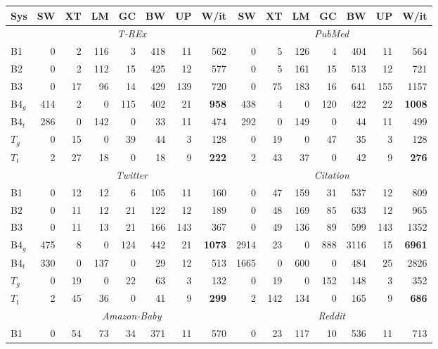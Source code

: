 \begin{tabular*}{\columnwidth}{@{\extracolsep{\fill}}l rrrrrr r rrrrrr r@{}}
\toprule
\textbf{Sys} & SW & XT & LM & GC & BW & UP & W/it & SW & XT & LM & GC & BW & UP & W/it\\
\midrule
& \multicolumn{7}{c}{\textit{T-REx}} & \multicolumn{7}{c}{\textit{PubMed}}\\
\cmidrule(lr){2-8}\cmidrule(l){9-15}
B1 & 0 & 2 & 116 & 3 & 418 & 11 & 562 & 0 & 5 & 126 & 4 & 404 & 11 & 564\\
B2 & 0 & 2 & 112 & 15 & 425 & 12 & 577 & 0 & 5 & 161 & 15 & 513 & 12 & 721\\
B3 & 0 & 17 & 96 & 14 & 429 & 139 & 720 & 0 & 75 & 183 & 16 & 641 & 155 & 1157\\
B4$_g$ & 414 & 2 & 0 & 115 & 402 & 21 & \textbf{958} & 438 & 4 & 0 & 120 & 422 & 22 & \textbf{1008}\\
B4$_t$ & 286 & 0 & 142 & 0 & 33 & 11 & 474 & 292 & 0 & 149 & 0 & 44 & 11 & 499\\
$T_g$ & 0 & 15 & 0 & 39 & 44 & 3 & 128 & 0 & 19 & 0 & 47 & 35 & 3 & 128\\
$T_t$ & 2 & 27 & 18 & 0 & 18 & 9 & \textbf{222} & 2 & 43 & 37 & 0 & 42 & 9 & \textbf{276}\\
\addlinespace[1pt]
& \multicolumn{7}{c}{\textit{Twitter}} & \multicolumn{7}{c}{\textit{Citation}}\\
\cmidrule(lr){2-8}\cmidrule(l){9-15}
B1 & 0 & 12 & 12 & 6 & 105 & 11 & 160 & 0 & 47 & 159 & 31 & 537 & 12 & 809\\
B2 & 0 & 11 & 12 & 21 & 122 & 12 & 189 & 0 & 48 & 169 & 85 & 633 & 12 & 965\\
B3 & 0 & 11 & 13 & 21 & 166 & 143 & 367 & 0 & 49 & 136 & 89 & 599 & 143 & 1352\\
B4$_g$ & 475 & 8 & 0 & 124 & 442 & 21 & \textbf{1073} & 2914 & 23 & 0 & 888 & 3116 & 15 & \textbf{6961}\\
B4$_t$ & 330 & 0 & 137 & 0 & 29 & 12 & 513 & 1665 & 0 & 600 & 0 & 484 & 25 & 2826\\
$T_g$ & 0 & 19 & 0 & 22 & 63 & 3 & 132 & 0 & 19 & 0 & 152 & 148 & 3 & 352\\
$T_t$ & 2 & 45 & 36 & 0 & 41 & 9 & \textbf{299} & 2 & 142 & 134 & 0 & 165 & 9 & \textbf{686}\\
\addlinespace[1pt]
& \multicolumn{7}{c}{\textit{Amazon-Baby}} & \multicolumn{7}{c}{\textit{Reddit}}\\
\cmidrule(lr){2-8}\cmidrule(l){9-15}
B1 & 0 & 54 & 73 & 34 & 371 & 11 & 570 & 0 & 23 & 117 & 10 & 536 & 11 & 713\\

\end{tabular*}
